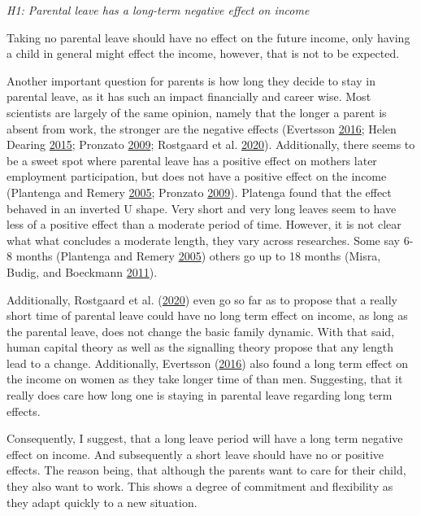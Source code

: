 \documentclass[
  12pt,
]{article}
\begin{document}
\emph{H1: Parental leave has a long-term negative effect on income}

Taking no parental leave should have no effect on the future income, only having a child in general might effect the income, however, that is not to be expected.

Another important question for parents is how long they decide to stay in parental leave, as it has such an impact financially and career wise.
Most scientists are largely of the same opinion, namely that the longer a parent is absent from work, the stronger are the negative effects (Evertsson \protect\hyperlink{ref-evertsson_parental_2016}{2016}; Helen Dearing \protect\hyperlink{ref-helen_dearing_does_2015}{2015}; Pronzato \protect\hyperlink{ref-pronzato_return_2009}{2009}; Rostgaard et al. \protect\hyperlink{ref-rostgaard_parental_2020}{2020}). Additionally, there seems to be a sweet spot where parental leave has a positive effect on mothers later employment participation, but does not have a positive effect on the income (Plantenga and Remery \protect\hyperlink{ref-plantenga_reconciliation_2005}{2005}; Pronzato \protect\hyperlink{ref-pronzato_return_2009}{2009}). Platenga found that the effect behaved in an inverted U shape. Very short and very long leaves seem to have less of a positive effect than a moderate period of time.
However, it is not clear what what concludes a moderate length, they vary across researches. Some say 6-8 months (Plantenga and Remery \protect\hyperlink{ref-plantenga_reconciliation_2005}{2005}) others go up to 18 months (Misra, Budig, and Boeckmann \protect\hyperlink{ref-misra_work-family_2011}{2011}).

Additionally, Rostgaard et al. (\protect\hyperlink{ref-rostgaard_parental_2020}{2020}) even go so far as to propose that a really short time of parental leave could have no long term effect on income, as long as the parental leave, does not change the basic family dynamic. With that said, human capital theory as well as the signalling theory propose that any length lead to a change. Additionally, Evertsson (\protect\hyperlink{ref-evertsson_parental_2016}{2016}) also found a long term effect on the income on women as they take longer time of than men. Suggesting, that it really does care how long one is staying in parental leave regarding long term effects.

Consequently, I suggest, that a long leave period will have a long term negative effect on income. And subsequently a short leave should have no or positive effects. The reason being, that although the parents want to care for their child, they also want to work. This shows a degree of commitment and flexibility as they adapt quickly to a new situation.
\end{document}
